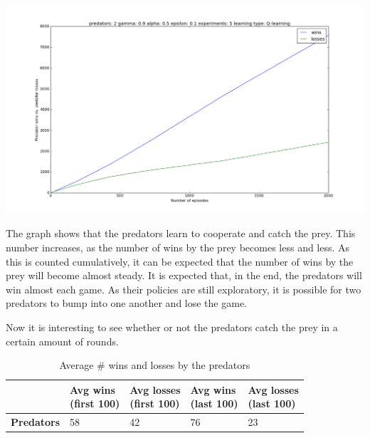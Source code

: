 \begin{center}
	\includegraphics[scale=0.3]{2_predators_q_learning}
\end{center}

The graph shows that the predators learn to cooperate and catch the prey. This number increases, as the number of wins by the prey becomes less and less. As this is counted cumulatively, it can be expected that the number of wins by the prey will become almost steady. It is expected that, in the end, the predators will win almost each game. As their policies are still exploratory, it is possible for two predators to bump into one another and lose the game.

Now it is interesting to see whether or not the predators catch the prey in a certain amount of rounds.

\begin{table}[H]
\begin{center}
\begin{tabular}{| l | l | l | l | l |}
\hline
 & \parbox{2cm}{\textbf{Avg wins \\ (first 100)}} & \parbox{2cm}{\textbf{Avg losses \\ (first 100)}} & \parbox{2cm}{\textbf{Avg wins \\ (last 100)}} & \parbox{2cm}{\textbf{Avg losses \\ (last 100)}} \\
\hline
\textbf{Predators} & 58 & 42 & 76 & 23 \\
\hline
\end{tabular}
\caption{Average \# wins and losses by the predators}
\end{center}
\end{table}

